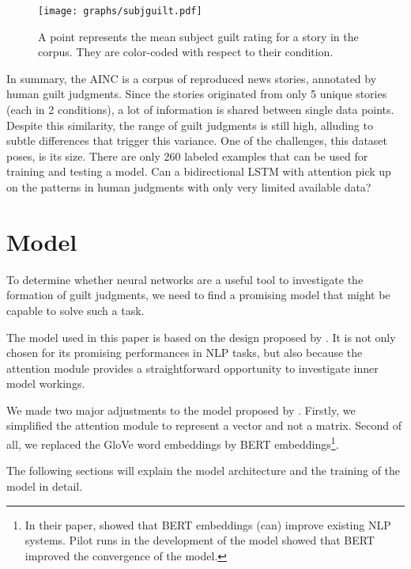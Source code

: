 \documentclass[11pt,a4paper]{article}
\begin{document}

\begin{figure}[t!]
	\texttt{[image: graphs/subjguilt.pdf]}
	\caption{A point represents the mean subject guilt rating for a story in the corpus. They are color-coded with respect to their condition.}
	\label{fig:corpus-annotations}
\end{figure}

In summary, the AINC is a corpus of reproduced news stories, annotated by human guilt judgments. Since the stories originated from only 5 unique stories (each in 2 conditions), a lot of information is shared between single data points.  Despite this similarity, the range of guilt judgments is still high, alluding to subtle differences that trigger this variance. 
One of the challenges, this dataset poses, is its size. There are only 260 labeled examples that can be used for training and testing a model.
Can a bidirectional LSTM with attention pick up on the patterns in human judgments with only very limited available data?

\section{Model}

To determine whether neural networks are a useful tool to investigate the formation of guilt judgments, we need to find a promising model that might be capable to solve such a task. 

The model used in this paper is based on the design proposed by \cite{Lin:2017}. It is not only chosen for its promising performances in NLP tasks, but also because the attention module provides a straightforward opportunity to investigate inner model workings. 

We made two major adjustments to the model proposed by \citeauthor{Lin:2017}. Firstly, we simplified the attention module to represent a vector and not a matrix. Second of all, we replaced the GloVe word embeddings by BERT embeddings\footnote{In their paper, \citeauthor{Devlin:2018} showed that BERT embeddings (can) improve existing NLP systems. Pilot runs in the development of the model showed that BERT improved the convergence of the model.}.

The following sections will explain the model architecture and the training of the model in detail.
\end{document}
